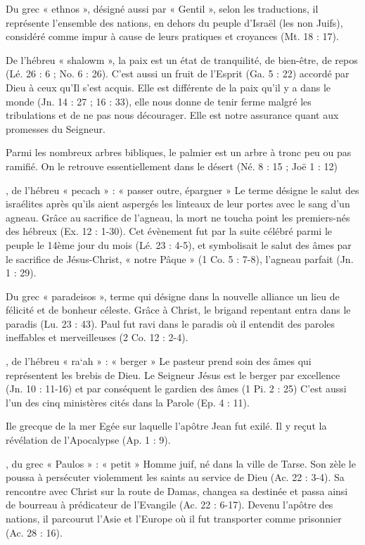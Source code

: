 \begin{multicols}{2}
 Du grec « ethnos », désigné aussi par « Gentil », selon les traductions, il représente l'ensemble des nations, en dehors du peuple d'Israël (les non Juifs), considéré comme impur à cause de leurs pratiques et croyances (Mt. 18 : 17).


De l'hébreu « shalowm », la paix est un état de tranquilité, de bien-être, de repos (Lé. 26 : 6 ; No. 6 : 26). C'est aussi un fruit de l'Esprit (Ga. 5 : 22) accordé par Dieu à ceux qu'Il s'est acquis. Elle est différente de la paix qu'il y a dans le monde (Jn. 14 : 27 ; 16 : 33), elle nous donne de tenir ferme malgré les tribulations et de ne pas nous décourager. Elle est notre assurance quant aux promesses du Seigneur.


Parmi les nombreux arbres bibliques, le palmier est un arbre à tronc peu ou pas ramifié. On le retrouve essentiellement dans le désert (Né. 8 : 15 ; Joë 1 : 12)


, de l'hébreu « pecach » : « passer outre, épargner »
Le terme désigne le salut des israélites après qu'ils aient aspergés les linteaux de leur portes avec le sang d'un agneau. Grâce au sacrifice de l'agneau, la mort ne toucha point les premiers-nés des hébreux (Ex. 12 : 1-30). Cet évènement fut par la suite célébré parmi le peuple le 14ème jour du mois (Lé. 23 : 4-5), et symbolisait le salut des âmes par le sacrifice de Jésus-Christ, « notre Pâque » (1 Co. 5 : 7-8), l'agneau parfait (Jn. 1 : 29).


Du grec « paradeisos », terme qui désigne dans la nouvelle alliance un lieu de félicité et de bonheur céleste. Grâce à Christ, le brigand repentant entra dans le paradis (Lu. 23 : 43). Paul fut ravi dans le paradis où il entendit des paroles ineffables et merveilleuses (2 Co. 12 : 2-4).

, de l'hébreu « ra`ah » : « berger »
Le pasteur prend soin des âmes qui représentent les brebis de Dieu.
Le Seigneur Jésus est le berger par excellence (Jn. 10 : 11-16) et par conséquent le gardien des âmes (1 Pi. 2 : 25)
C'est aussi l'un des cinq ministères cités dans la Parole (Ep. 4 : 11).


Ile grecque de la mer Egée sur laquelle l'apôtre Jean fut exilé. Il y reçut la révélation de l'Apocalypse (Ap. 1 : 9).


, du grec « Paulos » : « petit »
Homme juif, né dans la ville de Tarse. Son zèle le poussa à persécuter violemment les saints au service de Dieu (Ac. 22 : 3-4). Sa rencontre avec Christ sur la route de Damas, changea sa destinée et passa ainsi de bourreau à prédicateur de l'Evangile (Ac. 22 : 6-17).
Devenu l'apôtre des nations, il parcourut l'Asie et l'Europe où il fut transporter comme prisonnier (Ac. 28 : 16).


\end{multicols}
